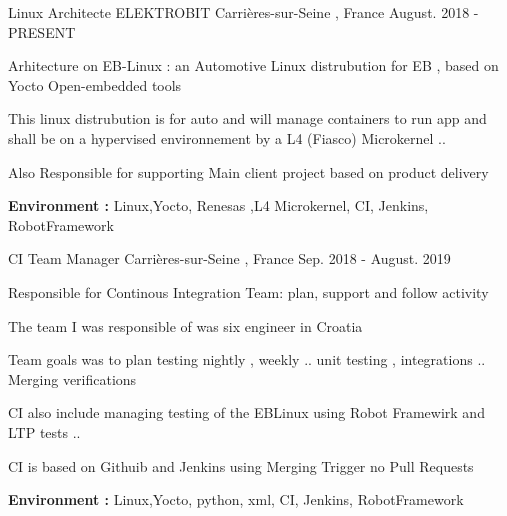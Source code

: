 


\begin{cventries}


\cventry
{Linux Architecte } %
{ELEKTROBIT} %
{Carrières-sur-Seine , France} %
{August. 2018 - PRESENT} %
{ %
\begin{cvitems}
\item {Arhitecture on EB-Linux : an Automotive Linux distrubution for EB , based on Yocto Open-embedded tools}
\item {This linux distrubution is for auto and will manage containers to run app and shall be on a hypervised environnement by a L4 (Fiasco) Microkernel ..}
\item {Also Responsible for supporting Main client project based on product delivery }
\item { \textbf{Environment :} Linux,Yocto, Renesas ,L4 Microkernel, CI, Jenkins, RobotFramework}
\end{cvitems}
}

\cventry
{CI Team Manager} %
{} %
{Carrières-sur-Seine , France} %
{Sep. 2018 - August. 2019} %
{ %
\begin{cvitems}
\item {Responsible for Continous Integration Team: plan, support and follow activity}
\item {The team I was responsible of was  six engineer in Croatia }
\item {Team goals was to plan testing nightly , weekly .. unit testing , integrations .. Merging verifications  }
\item {CI also include managing testing of the EBLinux using Robot Framewirk and LTP tests ..  }
\item {CI is based on Githuib and Jenkins using Merging Trigger no Pull Requests}
\item { \textbf{Environment :} Linux,Yocto, python, xml, CI, Jenkins, RobotFramework}
\end{cvitems}
}


\end{cventries}

